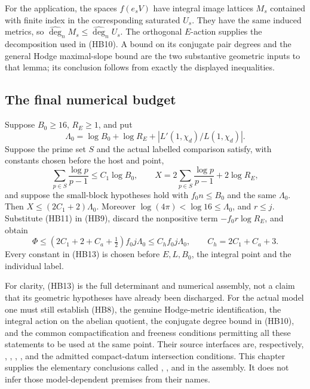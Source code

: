 For the application, the spaces \(f(e_sV)\) have integral
image lattices \(M_s\) contained with finite index in the
corresponding saturated \(U_s\).
They have the same induced metrics, so
\(\widehat{\deg}_nM_s\le\widehat{\deg}_nU_s\).
The orthogonal \(E\)-action supplies the decomposition used
in (HB10).  A bound on its conjugate pair degrees and the
general Hodge maximal-slope bound are the two substantive
geometric inputs to that lemma; its conclusion follows
from exactly the displayed inequalities.

\subsection{The final numerical budget}

Suppose \(B_0\ge16\), \(R_E\ge1\), and put
\[
 \Lambda_0=\log B_0+\log R_E+|L'(1,\chi_d)/L(1,\chi_d)|.
\]
Suppose the prime set \(S\) and the actual labelled comparison
satisfy, with constants chosen before the host and point,
\[
 \sum_{p\in S}\frac{\log p}{p-1}\le C_1\log B_0,\qquad
 X=2\sum_{p\in S}\frac{\log p}{p-1}+2\log R_E,
 \tag{HB12}
\]
and suppose the small-block hypotheses hold with
\(f_0n\le B_0\) and the same \(\Lambda_0\).
Then \(X\le(2C_1+2)\Lambda_0\).
Moreover \(\log(4\pi)<\log16\le\Lambda_0\), and \(r\le j\).
Substitute (HB11) in (HB9), discard the nonpositive term
\(-f_0r\log R_E\), and obtain
\[
 \Phi\le(2C_1+2+C_a+\tfrac12)f_0j\Lambda_0
                     \le C_h f_0j\Lambda_0,\qquad
                 C_h=2C_1+C_a+3.
 \tag{HB13}\label{eq:sr-hb-final-budget}
\]
Every constant in (HB13) is chosen before \(E,L,B_0\), the
integral point and the individual label.

For clarity, (HB13) is the full determinant and numerical
assembly, not a claim that its geometric hypotheses have
already been discharged.  For the actual model one must
still establish (HB8), the genuine Hodge-metric identification,
the integral action on the abelian quotient, the conjugate
degree bound in (HB10), and the common compactification and
freeness conditions permitting all these statements to be
used at the same point.  Their source interfaces are,
respectively, ,
, ,
, and the admitted compact-datum intersection
conditions.  This chapter supplies the elementary conclusions
called , , and
 in the
 assembly.
It does not infer those model-dependent premises from their names.
